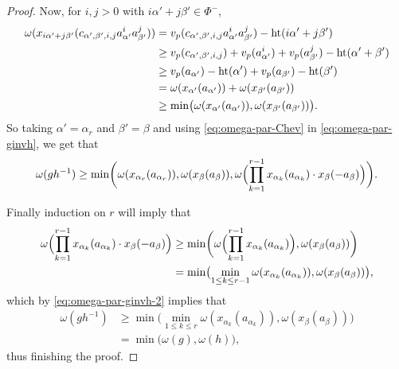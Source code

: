 \begin{proof}
Now, for $i,j>0$ with $i\alpha'+j\beta' \in \Phi^{-}$,
\begin{equation}\label{eq:omega-par-Chev}
  \begin{aligned}
    \omega(x_{i\alpha'+j\beta'}(c_{\alpha',\beta',i,j}a_{\alpha'}^{i}a_{\beta'}^{j})) &= v_p(c_{\alpha',\beta',i,j}a_{\alpha'}^{i}a_{\beta'}^{j}) - \operatorname{ht}(i\alpha'+j\beta') \\*
    &\geq v_p(c_{\alpha',\beta',i,j}) + v_p(a_{\alpha'}^{i}) + v_p(a_{\beta'}^{j}) - \operatorname{ht}(\alpha'+\beta') \\*
    &\geq v_p(a_{\alpha'}) - \operatorname{ht}(\alpha') + v_p(a_{\beta'}) - \operatorname{ht}(\beta') \\*
    &= \omega(x_{\alpha'}(a_{\alpha'})) + \omega(x_{\beta'}(a_{\beta'})) \\*
    &\geq \min\bigl( \omega(x_{\alpha'}(a_{\alpha'})), \omega(x_{\beta'}(a_{\beta'})) \bigr).
  \end{aligned}
\end{equation}
So taking $\alpha' = \alpha_{r}$ and $\beta' = \beta$ and using \eqref{eq:omega-par-Chev} in \eqref{eq:omega-par-ginvh}, we get that
\begin{equation}\label{eq:omega-par-ginvh-2}
  \omega(gh^{-1}) \geq \min\biggl( \omega(x_{\alpha_{r}}(a_{\alpha_{r}})), \omega(x_{\beta}(a_{\beta})), \omega\Bigl( \prod_{k=1}^{r-1} x_{\alpha_{k}}(a_{\alpha_{k}}) \cdot x_{\beta}(-a_{\beta}) \Bigr) \biggr).
\end{equation}

Finally induction on $r$ will imply that
\begin{align*}
  \omega\Bigl( \prod_{k=1}^{r-1} x_{\alpha_{k}}(a_{\alpha_{k}}) \cdot x_{\beta}(-a_{\beta}) \Bigr) &\geq \min\biggl( \omega\Bigl( \prod_{k=1}^{r-1} x_{\alpha_{k}}(a_{\alpha_{k}})\Bigr) , \omega(x_{\beta}(a_{\beta})) \biggr) \\
                                                     &= \min\bigl( \min_{1 \leq k \leq r-1} \omega(x_{\alpha_{k}}(a_{\alpha_{k}})), \omega(x_{\beta}(a_{\beta})) \bigr),
\end{align*}
which by \eqref{eq:omega-par-ginvh-2} implies that
\begin{align*}
  \omega(gh^{-1}) &\geq \min\bigl( \min_{1 \leq k \leq r} \omega(x_{\alpha_{k}}(a_{\alpha_{k}})), \omega(x_{\beta}(a_{\beta})) \bigr) \\
             &= \min\bigl( \omega(g), \omega(h) \bigr),
\end{align*}
thus finishing the proof.
\end{proof}

